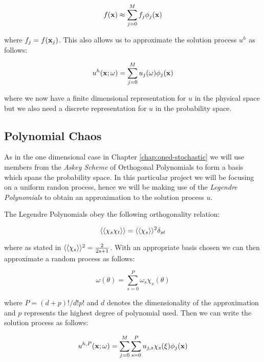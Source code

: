 \begin{equation}\label{eq:twod-stochastic-f-approx}
    f(\mathbf{x}) \approx \sum_{j=0}^Mf_j\phi_j(\mathbf{x})
\end{equation}

where $f_j = f(\mathbf{x}_j)$. This also allows us to approximate the solution
process $u^h$ as follows:

\begin{equation}
    u^h(\mathbf{x};\omega) = \sum_{j=0}^Mu_j(\omega)\phi_j(\mathbf{x})
\end{equation}

where we now have a finite dimensional representation for $u$ in the physical
space but we also need a discrete representation for $u$ in the probability
space.

\subsection{Polynomial Chaos}

As in the one dimensional case in Chapter \ref{chap:oned-stochastic} we will
use members from the \textit{Askey Scheme} of Orthogonal Polynomials to form a
basis which spans the probability space. In this particular project we will be
focusing on a uniform randon process, hence we will be making use of the
\textit{Legendre Polynomials} to obtain an approximation to the solution process
$u$.

The Legendre Polynomials obey the following orthogonality relation:

\begin{equation}
    \left\langle\langle\chi_s\chi_t\right\rangle\rangle = \left\langle\langle\chi_s\right\rangle\rangle^2\delta_{st}
\end{equation}

where as stated in \cite{poly-bible} $\left\langle\langle\chi_s\right\rangle\rangle^2 = \frac{2}{2s + 1}$.
With an appropriate basis chosen we can then approximate a random process as
follows:

\begin{equation}
    \omega(\theta) = \sum_{s=0}^P\omega_s\chi_s(\theta)
\end{equation}

where $P = (d + p)!/d!p!$ and $d$ denotes the dimensionality of the
approximation and $p$ represents the highest degree of polynomial used. Then we
can write the solution process as follows:

\begin{equation}\label{eq:twod-stochastic-uhp}
    u^{h,P}(\mathbf{x};\omega) = \sum_{j=0}^M\sum_{s=0}^Pu_{j,s}
        \chi_s(\xi)\phi_j(\mathbf{x})
\end{equation}



